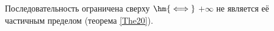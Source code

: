 
Последовательность ограничена сверху $\hm{\iff}$ $+\infty$ не является её частичным пределом (теорема \ref{The20}).

